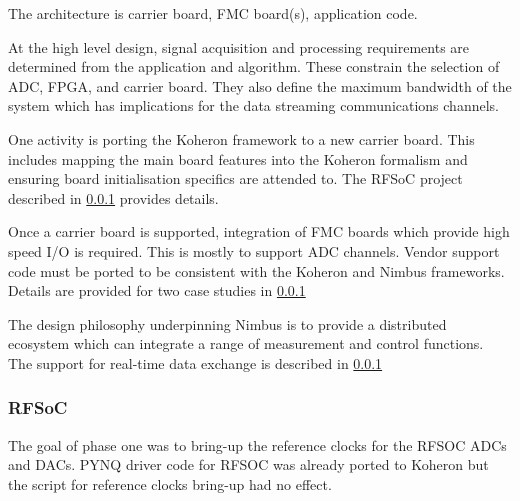 \documentclass[preprint]{elsarticle}
\begin{document}
The architecture is carrier board, FMC board(s), application code.

At the high level design, signal acquisition and processing requirements are
determined from the application and algorithm.  These constrain the selection of ADC, FPGA, and
carrier board. They also define the maximum bandwidth of the system which has
implications for the data streaming communications channels.

One activity is porting the Koheron framework to a new carrier board.
This includes mapping the main board features into the Koheron formalism
and ensuring board initialisation specifics are attended to.  The RFSoC
project described in \ref{} provides details.

Once a carrier board is supported, integration of FMC boards which 
provide high speed I/O is required. This is mostly to support ADC channels.
Vendor support code must be ported to be consistent with the 
Koheron and Nimbus frameworks. Details are provided for two case
studies in \ref{}

The design philosophy underpinning Nimbus is to provide a distributed ecosystem
which can integrate a range of measurement and control functions.
The support for real-time data exchange is described in \ref{}




\subsubsection{RFSoC}
The goal of phase one was to bring-up the reference clocks for the RFSOC ADCs and DACs. PYNQ driver code for RFSOC was already ported to Koheron but the script for reference clocks bring-up had no effect.
\end{document}
